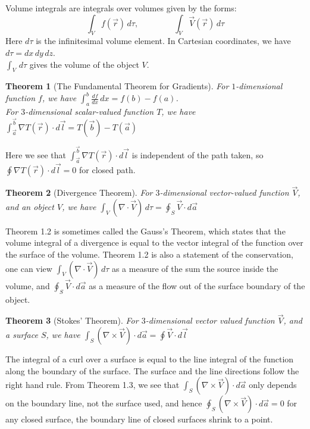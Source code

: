 \documentclass[11pt,oneside]{book}
\theoremstyle{break}
\theoremstyle{break}
\newtheorem{thm}{Theorem}[section]
\begin{document}
Volume integrals are integrals over volumes given by the forms:
$$\int_V f(\vec{r})\, d\tau,\ \qquad \qquad \int_V \vec{V}(\vec{r})\, d\tau$$
Here $d\tau$ is the infinitesimal volume element. In Cartesian coordinates, we have $d\tau = dx\, dy\, dz$. \\
$\int_V\, d\tau$ gives the volume of the object $V$. \\

\begin{thm}[The Fundamental Theorem for Gradients]
For $1$-dimensional function $f$, we have $\int_a^b \frac{df}{dx}\, dx = f(b) - f(a)$.\\
For $3$-dimensional scalar-valued function $T$, we have $\int_{\vec{a}}^{\vec{b}} \nabla T(\vec{r})\cdot d\vec{l} = T(\vec{b}) - T(\vec{a})$
\end{thm}

Here we see that $\int_{\vec{a}}^{\vec{b}} \nabla T(\vec{r})\cdot d\vec{l}$ is independent of the path taken, so $\oint \nabla T(\vec{r})\cdot d\vec{l} = 0$ for closed path.\\

\begin{thm}[Divergence Theorem]
For $3$-dimensional vector-valued function $\vec{V}$, and an object $V$, we have $\int_V (\nabla \cdot \vec{V})\, d\tau = \oint_S \vec{V}\cdot d\vec{a}$
\end{thm}
Theorem 1.2 is sometimes called the Gauss's Theorem, which states that the volume integral of a divergence is equal to the vector integral of the function over the surface of the volume. Theorem 1.2 is also a statement of the conservation, one can view $\int_V (\nabla \cdot \vec{V})\, d\tau$ as a measure of the sum the source inside the volume, and $\oint_S \vec{V}\cdot d\vec{a}$ as a measure of the flow out of the surface boundary of the object.\\

\begin{thm}[Stokes' Theorem]
For $3$-dimensional vector valued function $\vec{V}$, and a surface $S$, we have $\int_S (\nabla\times \vec{V}) \cdot d\vec{a} = \oint \vec{V}\cdot d\vec{l}$
\end{thm}
The integral of a curl over a surface is equal to the line integral of the function along the boundary of the surface. The surface and the line directions follow the right hand rule. From Theorem 1.3, we see that $\int_S (\nabla\times \vec{V}) \cdot d\vec{a}$ only depends on the boundary line, not the surface used, and hence $\oint_S (\nabla\times \vec{V}) \cdot d\vec{a} = 0$ for any closed surface, the boundary line of closed surfaces shrink to a point. 
\end{document}
